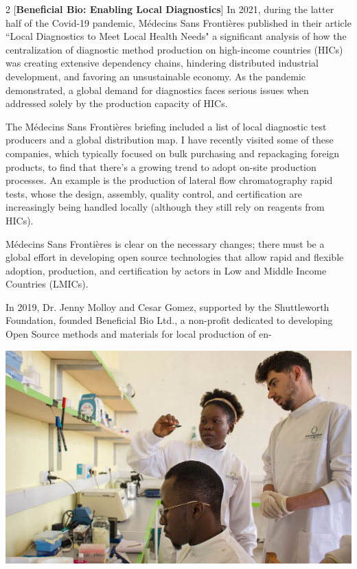 \documentclass{article}
\date{\today}
\begin{document}
\maketitle

\begin{multicols}{2}
[\textbf{\huge Beneficial Bio: Enabling Local Diagnostics}]
In 2021, during the latter half of the Covid-19 pandemic, Médecins Sans Frontières published in their article ``Local Diagnostics to Meet Local Health Needs" 
a significant analysis of how the centralization of diagnostic method production on high-income countries (HICs) was creating extensive dependency chains,
 hindering distributed industrial development, and favoring an unsustainable economy. As the pandemic demonstrated, a global demand for diagnostics faces serious 
 issues when addressed solely by the production capacity of HICs.

The Médecins Sans Frontières briefing included a list of local diagnostic test producers and a global distribution map. I have recently visited some of these companies,
 which typically focused on bulk purchasing and repackaging foreign products, to find that there's a growing trend to adopt on-site production processes. An example is 
 the production of lateral flow chromatography rapid tests, whose the design, assembly, quality control, and certification
  are increasingly being handled locally (although they still rely on reagents from HICs).

Médecins Sans Frontières is clear on the necessary changes; there must be a global effort in developing open source technologies that allow rapid and flexible adoption, 
production, and certification by actors in Low and Middle Income Countries (LMICs).

In 2019, Dr. Jenny Molloy and Cesar Gomez, supported by the Shuttleworth Foundation, founded Beneficial Bio Ltd., a non-profit dedicated to developing Open Source methods and materials for local production
of en-
\begin{center}
  \includegraphics[width=\linewidth]{lab.jpg}
\end{center}
\columnbreak


\end{multicols}
\end{document}
